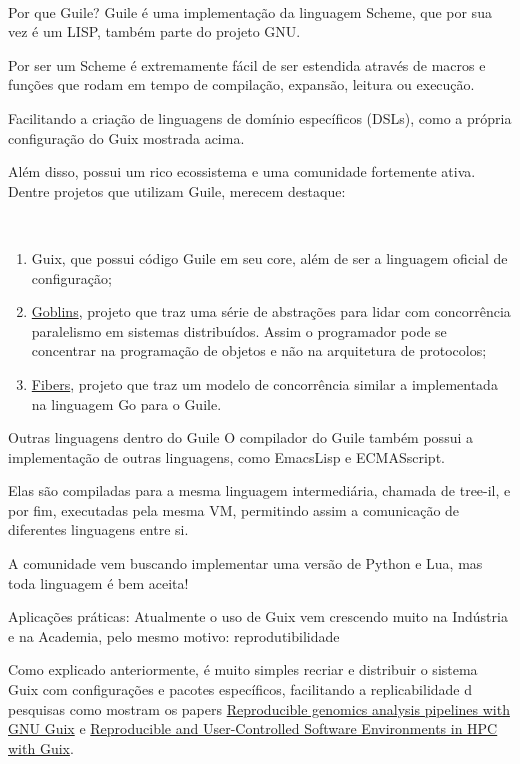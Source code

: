 \documentclass[bigger]{beamer}
\begin{document}
\begin{frame}[label={sec:org8b14c21}]{⁤}
\begin{minipage}[c]{0.5\textwidth}
\end{minipage}
\end{frame}
\begin{frame}[label={sec:org71594fe}]{Por que Guile?}
Guile é uma implementação da linguagem Scheme, que por sua vez é um LISP, também parte do projeto GNU.

Por ser um Scheme é extremamente fácil de ser estendida através de macros e funções que rodam em tempo de
compilação, expansão, leitura ou execução.

Facilitando a criação de linguagens de domínio específicos (DSLs), como a própria configuração do Guix mostrada
acima.

Além disso, possui um rico ecossistema e uma comunidade fortemente ativa. Dentre projetos que utilizam Guile,
merecem destaque:
\end{frame}
\begin{frame}[label={sec:org3002fa8}]{⁤}
\begin{enumerate}
\item Guix, que possui código Guile em seu core, além de ser a linguagem oficial de configuração;
\item \href{https://spritely.institute/goblins/}{Goblins}, projeto que traz uma série de abstrações para lidar com concorrência paralelismo em sistemas
distribuídos. Assim o programador pode se concentrar na programação de objetos e não na
arquitetura de protocolos;
\item \href{https://github.com/wingo/fibers}{Fibers}, projeto que traz um modelo de concorrência similar a implementada na linguagem Go para o Guile.
\end{enumerate}
\end{frame}
\begin{frame}[label={sec:orgf0e01c0}]{Outras linguagens dentro do Guile}
O compilador do Guile também possui a implementação de outras linguagens, como EmacsLisp e ECMASscript.

Elas são compiladas para a mesma linguagem intermediária, chamada de tree-il, e por fim, executadas pela
mesma VM, permitindo assim a comunicação de diferentes linguagens entre si.

A comunidade vem buscando implementar uma versão de Python e Lua, mas toda linguagem é bem aceita!
\end{frame}
\begin{frame}[label={sec:orgd430f02}]{Aplicações práticas:}
Atualmente o uso de Guix vem crescendo muito na Indústria e na Academia, pelo mesmo motivo: reprodutibilidade

Como explicado anteriormente, é muito simples recriar e distribuir o sistema Guix com configurações e pacotes
específicos, facilitando a replicabilidade d pesquisas como mostram os papers
\href{https://www.biorxiv.org/content/10.1101/298653v2}{Reproducible genomics analysis pipelines with GNU Guix} e
\href{https://inria.hal.science/hal-01161771/en}{Reproducible and User-Controlled Software Environments in HPC with Guix}.
\end{frame}
\end{document}
